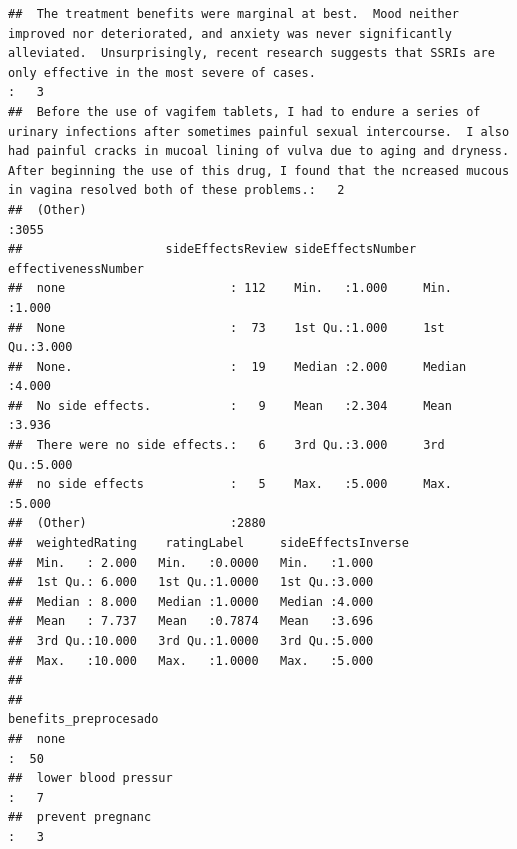 \documentclass[spanish,]{article}
\begin{document}
\begin{verbatim}
##  The treatment benefits were marginal at best.  Mood neither improved nor deteriorated, and anxiety was never significantly alleviated.  Unsurprisingly, recent research suggests that SSRIs are only effective in the most severe of cases.                                                                                    :   3  
##  Before the use of vagifem tablets, I had to endure a series of urinary infections after sometimes painful sexual intercourse.  I also had painful cracks in mucoal lining of vulva due to aging and dryness.  After beginning the use of this drug, I found that the ncreased mucous in vagina resolved both of these problems.:   2  
##  (Other)                                                                                                                                                                                                                                                                                                                        :3055  
##                    sideEffectsReview sideEffectsNumber effectivenessNumber
##  none                       : 112    Min.   :1.000     Min.   :1.000      
##  None                       :  73    1st Qu.:1.000     1st Qu.:3.000      
##  None.                      :  19    Median :2.000     Median :4.000      
##  No side effects.           :   9    Mean   :2.304     Mean   :3.936      
##  There were no side effects.:   6    3rd Qu.:3.000     3rd Qu.:5.000      
##  no side effects            :   5    Max.   :5.000     Max.   :5.000      
##  (Other)                    :2880                                         
##  weightedRating    ratingLabel     sideEffectsInverse
##  Min.   : 2.000   Min.   :0.0000   Min.   :1.000     
##  1st Qu.: 6.000   1st Qu.:1.0000   1st Qu.:3.000     
##  Median : 8.000   Median :1.0000   Median :4.000     
##  Mean   : 7.737   Mean   :0.7874   Mean   :3.696     
##  3rd Qu.:10.000   3rd Qu.:1.0000   3rd Qu.:5.000     
##  Max.   :10.000   Max.   :1.0000   Max.   :5.000     
##                                                      
##                                                                                                                                           benefits_preprocesado
##  none                                                                                                                                                :  50     
##  lower blood pressur                                                                                                                                 :   7     
##  prevent pregnanc                                                                                                                                    :   3     

\end{verbatim}
\end{document}
